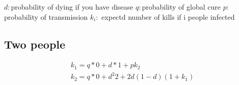 \documentclass[12pt]{report}
\numberwithin{equation}{section}
\begin{document}
$d: $probability of dying if you have disease
$q: $probability of global cure
$p: $probability of transmission
$k_i:$ expectd number of kills if i people infected 

\subsection{Two people}

\begin{align*}
k_1 = q*0+d*1+pk_2 \\
k_2 = q*0+d^2 2 + 2d(1-d)(1+k_1) \\
\end{align*}




















\end{document}
